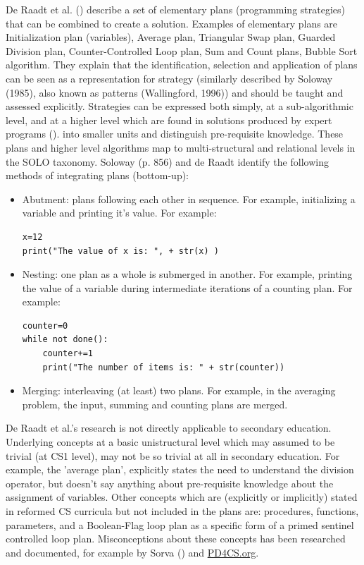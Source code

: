 De Raadt et al. (\cite{deRaadt2009teachingPlans}) describe a set of elementary plans (programming strategies) that can be combined to create a solution. Examples of elementary plans are Initialization plan (variables), Average plan, Triangular Swap plan, Guarded Division plan, Counter-Controlled Loop plan, Sum and Count plans, Bubble Sort algorithm. They explain that the identification, selection and application of plans can be seen as a representation for strategy (similarly described by Soloway (1985), also known as patterns (Wallingford, 1996)) and should be taught and assessed explicitly.
Strategies can be expressed both simply, at a sub-algorithmic level, and at a higher level which are found in solutions produced by expert programs (\cite{deRaadt2006}).  into  smaller units and distinguish pre-requisite knowledge. These plans and higher level algorithms map to multi-structural and relational levels in the SOLO taxonomy. Soloway (p. 856) and de Raadt identify the following methods of integrating plans (bottom-up):
\begin{itemize}
\item Abutment: plans following each other in sequence. For example, initializing a variable and printing it’s value. For example:
\begin{verbatim}
x=12
print("The value of x is: ", + str(x) )
\end{verbatim}

\item Nesting: one plan as a whole is submerged in another. For example, printing the value of a variable during intermediate iterations of a counting plan. For example:
\begin{verbatim}
counter=0
while not done():
    counter+=1
    print("The number of items is: " + str(counter))
\end{verbatim}

\item Merging: interleaving (at least) two plans. For example, in the averaging problem, the input, summing and counting plans are merged.
\end{itemize}

De Raadt et al.'s research is not directly applicable to secondary education. Underlying concepts at a basic unistructural level which may assumed to be trivial (at CS1 level), may not be so trivial at all in secondary education. For example, the 'average plan', explicitly states the need to understand the division operator, but doesn't say anything about pre-requisite knowledge about the assignment of variables. Other concepts which are (explicitly or implicitly) stated in reformed CS curricula but not included in the plans are: procedures, functions, parameters, and a Boolean-Flag loop plan as a specific form of a primed sentinel controlled loop plan. Misconceptions about these concepts has been researched and documented, for example by Sorva (\cite{sorva2013notional}) and \url{PD4CS.org}.



